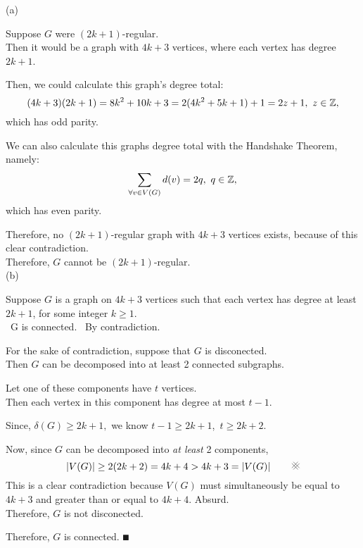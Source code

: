 \documentclass[a4paper,11pt]{report}
\begin{document}
\newpage
{}
\sol (a) \vspace{0.3em}

Suppose $G$ were $(2k+1)$-regular. \\
Then it would be a graph with $4k+3$ vertices, where each vertex has degree $2k+1$. \vspace{0.3em}

Then, we could calculate this graph's degree total: 
\[
  (4k+3)(2k+1) = 8k^2+10k+3 = 2(4k^2+5k+1)+1 = 2z+1,\ z\in\mathbb{Z},
\]
which has odd parity. \vspace{0.3em}

We can also calculate this graphs degree total with the Handshake Theorem, namely:
\[
  \sum_{\forall v\in V(G)} d(v) = 2q,\ q\in\mathbb{Z},
\]
which has even parity.\vspace{0.3em}

Therefore, no $(2k+1)$-regular graph with $4k+3$ vertices exists, because of this clear contradiction.\\
Therefore, $G$ cannot be $(2k+1)$-regular. \\

\sol (b) \vspace{0.5em}

Suppose $G$ is a graph on $4k+3$ vertices such that each vertex has degree at least $2k+1$, for some integer $k\geq1$. \\
\Claim\ G is connected.
\proof\ By contradiction.
\begin{list}{}{\setlength{\leftmargin}{0.6in}\setlength{\topsep}{0pt}}\item 
  For the sake of contradiction, suppose that $G$ is disconected. \\
  Then $G$ can be decomposed into at least 2 connected subgraphs. 

  Let one of these components have $t$ vertices. \\
  Then each vertex in this component has degree at most $t-1$.

  Since, $\delta(G)\geq 2k+1,$ we know $t-1\geq 2k+1$,\ $t\geq 2k+2$.

  Now, since $G$ can be decomposed into \textit{at least} 2 components,
  \begin{equation*}
    \abs{V(G)}\geq 2(2k+2) = 4k+4 > 4k+3 = \abs{V(G)} \tag*{\CONTRA}
  \end{equation*}
  This is a clear contradiction because $V(G)$ must simultaneously be equal to $4k+3$ and greater than or equal to $4k+4$. Absurd. \\
  Therefore, $G$ is not disconected.  
\end{list}
Therefore, $G$ is connected. $\QED$
\end{document}
